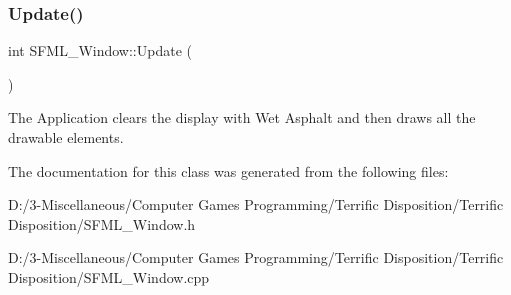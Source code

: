 \subsubsection{\texorpdfstring{Update()}{Update()}}
{\footnotesize\ttfamily int S\+F\+M\+L\+\_\+\+Window\+::\+Update (\begin{DoxyParamCaption}{ }\end{DoxyParamCaption})}


\begin{DoxyItemize}
\item The Application clears the display with Wet Asphalt and then draws all the drawable elements. 
\end{DoxyItemize}

The documentation for this class was generated from the following files\+:\begin{DoxyCompactItemize}
\item 
D\+:/3-\/\+Miscellaneous/\+Computer Games Programming/\+Terrific Disposition/\+Terrific Disposition/S\+F\+M\+L\+\_\+\+Window.\+h\item 
D\+:/3-\/\+Miscellaneous/\+Computer Games Programming/\+Terrific Disposition/\+Terrific Disposition/S\+F\+M\+L\+\_\+\+Window.\+cpp\end{DoxyCompactItemize}
